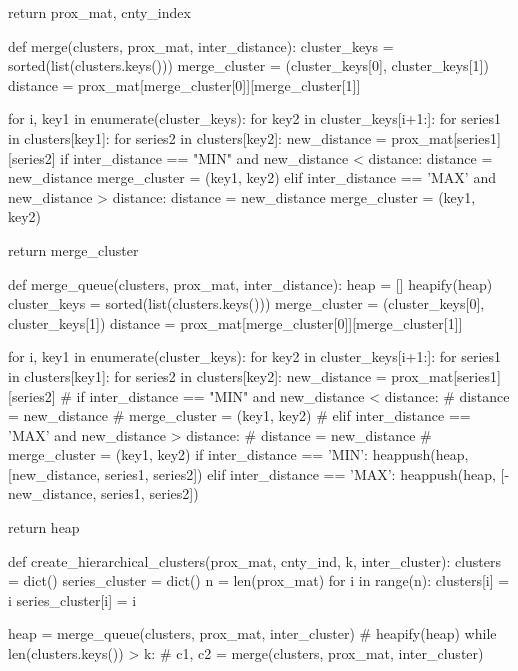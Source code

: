     return prox_mat, cnty_index


def merge(clusters, prox_mat, inter_distance):
    cluster_keys = sorted(list(clusters.keys()))
    merge_cluster = (cluster_keys[0], cluster_keys[1])
    distance = prox_mat[merge_cluster[0]][merge_cluster[1]]

    for i, key1 in enumerate(cluster_keys):
        for key2 in cluster_keys[i+1:]:
            for series1 in clusters[key1]:
                for series2 in clusters[key2]:
                    new_distance = prox_mat[series1][series2]
                    if inter_distance == "MIN" and new_distance < distance:
                        distance = new_distance
                        merge_cluster = (key1, key2)
                    elif inter_distance == 'MAX' and new_distance > distance:
                        distance = new_distance
                        merge_cluster = (key1, key2)

    return merge_cluster

def merge_queue(clusters, prox_mat, inter_distance):
    heap = []
    heapify(heap)
    cluster_keys = sorted(list(clusters.keys()))
    merge_cluster = (cluster_keys[0], cluster_keys[1])
    distance = prox_mat[merge_cluster[0]][merge_cluster[1]]

    for i, key1 in enumerate(cluster_keys):
        for key2 in cluster_keys[i+1:]:
            for series1 in clusters[key1]:
                for series2 in clusters[key2]:
                    new_distance = prox_mat[series1][series2]
                    # if inter_distance == "MIN" and new_distance < distance:
                    #     distance = new_distance
                    #     merge_cluster = (key1, key2)
                    # elif inter_distance == 'MAX' and new_distance > distance:
                    #     distance = new_distance
                    #     merge_cluster = (key1, key2)
                    if inter_distance == 'MIN':
                        heappush(heap, [new_distance, series1, series2])
                    elif inter_distance == 'MAX':
                        heappush(heap, [-new_distance, series1, series2])

    return heap


def create_hierarchical_clusters(prox_mat, cnty_ind, k, inter_cluster):
    clusters = dict()
    series_cluster = dict()
    n = len(prox_mat)
    for i in range(n):
        clusters[i] = {i}
        series_cluster[i] = i

    heap = merge_queue(clusters, prox_mat, inter_cluster)
    # heapify(heap)
    while len(clusters.keys()) > k:
        # c1, c2 = merge(clusters, prox_mat, inter_cluster)

